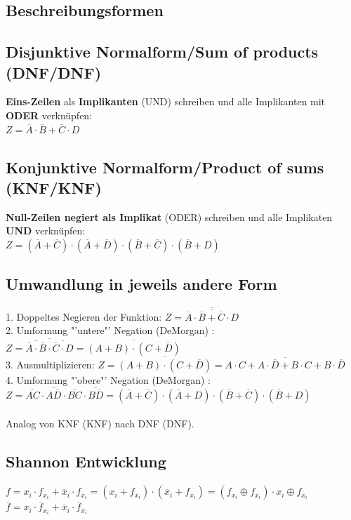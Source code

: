 \documentclass[6pt,a4paper]{scrartcl}
\newcommand{\ol}[1]{\ensuremath{\overline{#1}}}									%
\begin{document}
\begin{multicols*}{3}
\section{Beschreibungsformen}
	\subsection{Disjunktive Normalform/Sum of products (DNF/DNF)}
	\textbf{Eins-Zeilen} als \textbf{Implikanten} (UND) schreiben und alle Implikanten mit \textbf{ODER} verknüpfen: \\
	$Z = \overline A \cdot \overline B + \overline C \cdot D$

	\subsection{Konjunktive Normalform/Product of sums (KNF/KNF)}
	\textbf{Null-Zeilen negiert als Implikat} (ODER)  schreiben und alle Implikaten \textbf{UND} verknüpfen: \\
	$Z = ( \ol A + \ol C) \cdot ( \ol A + \ol D) \cdot ( \ol B + \ol C) \cdot ( \ol B + D)$

	\subsection{Umwandlung in jeweils andere Form}
	1. Doppeltes Negieren der Funktion: $ Z = \overline {\overline{\overline A \cdot \overline B + \overline C \cdot D}}$\\
	2. Umformung "'untere"'  Negation (DeMorgan) : $ Z = \ol{\ol{\ol A \cdot \ol B} \cdot \ol{\ol C \cdot D}} = \ol{(A+B) \cdot (C+\ol D)}$\\
	3. Ausmultiplizieren: $ Z = \ol{(A+B) \cdot (C+\ol D)} = \ol{A\cdot C + A\cdot \ol D + B \cdot C + B \cdot \ol D}$\\
	4. Umformung "'obere"'  Negation (DeMorgan) :\\ $ Z= \ol{AC} \cdot \ol{A \ol D} \cdot \ol{BC} \cdot \ol{B\ol D} = ( \ol A + \ol C) \cdot ( \ol A + D) \cdot ( \ol B + \ol C) \cdot ( \ol B + D)$\\ \\
	Analog von KNF (KNF) nach DNF (DNF).

	\subsection{Shannon Entwicklung}
		$f = x_i \cdot f_{x_i} + \ol x_i \cdot f_{\ol x_i} = (x_i + f_{\ol x_i})\cdot ( \ol x_i + f_{x_i}) = (f_{x_i} \oplus f_{\ol x_i}) \cdot x_i \oplus f_{\ol x_i}$ \\
		$\ol f = x_i \cdot \ol f_{x_i} + \ol x_i \cdot \ol f_{\ol x_i}$


\end{multicols*}
\end{document}
